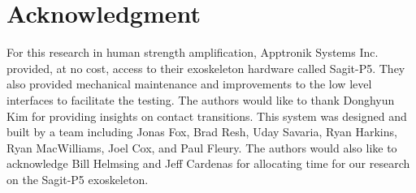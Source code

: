 \documentclass[utf8]{frontiersSCNS}
\begin{document}





\section*{Acknowledgment}
	For this research in human strength amplification, Apptronik Systems Inc. provided, at no cost, access to their exoskeleton hardware called Sagit-P5. They also provided mechanical maintenance and improvements to the low level interfaces to facilitate the testing. The authors would like to thank Donghyun Kim for providing insights on contact transitions. This system was designed and built by a team including Jonas Fox, Brad Resh, Uday Savaria, Ryan Harkins, Ryan MacWilliams, Joel Cox, and Paul Fleury. The authors would also like to acknowledge Bill Helmsing and Jeff Cardenas for allocating time for our research on the Sagit-P5 exoskeleton.
	
\end{document}
